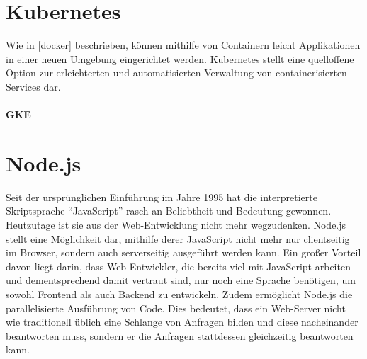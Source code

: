 \section{Kubernetes}
Wie in \ref{docker} beschrieben, können mithilfe von Containern leicht Applikationen in einer neuen Umgebung eingerichtet werden.
Kubernetes stellt eine quelloffene Option zur erleichterten und automatisierten Verwaltung von containerisierten Services dar.

\paragraph{\ac{GKE}}

\section{Node.js}
Seit der ursprünglichen Einführung im Jahre 1995 hat die interpretierte Skriptsprache \enquote{JavaScript} rasch an Beliebtheit und Bedeutung gewonnen.
Heutzutage ist sie aus der Web-Entwicklung nicht mehr wegzudenken.
Node.js stellt eine Möglichkeit dar, mithilfe derer JavaScript nicht mehr nur clientseitig im Browser, sondern auch serverseitig ausgeführt werden kann.
Ein großer Vorteil davon liegt darin, dass Web-Entwickler, die bereits viel mit JavaScript arbeiten und dementsprechend damit vertraut sind, nur noch eine Sprache benötigen, um sowohl Frontend als auch Backend zu entwickeln.
Zudem ermöglicht Node.js die parallelisierte Ausführung von Code.
Dies bedeutet, dass ein Web-Server nicht wie traditionell üblich eine Schlange von Anfragen bilden und diese nacheinander beantworten muss, sondern er die Anfragen stattdessen gleichzeitig beantworten kann.

